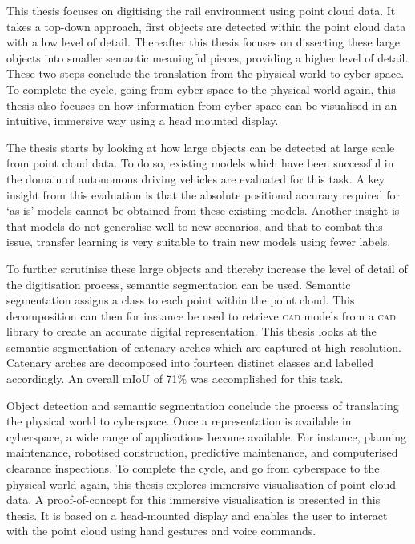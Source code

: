 This thesis focuses on digitising the rail environment using point cloud data. It takes a top-down approach, first objects are detected within the point cloud data with a low level of detail. Thereafter this thesis focuses on dissecting these large objects into smaller semantic meaningful pieces, providing a higher level of detail. These two steps conclude the translation from the physical world to cyber space. To complete the cycle, going from cyber space to the physical world again, this thesis also focuses on how information from cyber space can be visualised in an intuitive, immersive way using a head mounted display.

The thesis starts by looking at how large objects can be detected at large scale from point cloud data. To do so, existing models which have been successful in the domain of autonomous driving vehicles are evaluated for this task. A key insight from this evaluation is that the absolute positional accuracy required for `as-is' models cannot be obtained from these existing models. Another insight is that models do not generalise well to new scenarios, and that to combat this issue, transfer learning is very suitable to train new models using fewer labels.

To further scrutinise these large objects and thereby increase the level of detail of the digitisation process, semantic segmentation can be used. Semantic segmentation assigns a class to each point within the point cloud. This decomposition can then for instance be used to retrieve \textsc{cad} models from a \textsc{cad} library to create an accurate digital representation. This thesis looks at the semantic segmentation of catenary arches which are captured at high resolution. Catenary arches are decomposed into fourteen distinct classes and labelled accordingly. An overall mIoU of 71\% was accomplished for this task.

Object detection and semantic segmentation conclude the process of translating the physical world to cyberspace. Once a representation is available in cyberspace, a wide range of applications become available. For instance, planning maintenance, robotised construction, predictive maintenance, and computerised clearance inspections. To complete the cycle, and go from cyberspace to the physical world again, this thesis explores immersive visualisation of point cloud data. A proof-of-concept for this immersive visualisation is presented in this thesis. It is based on a head-mounted display and enables the user to interact with the point cloud using hand gestures and voice commands.

